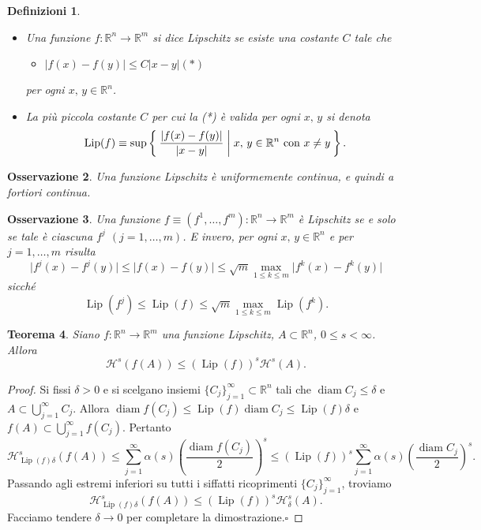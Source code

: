 \documentclass[a4paper,10pt,openright,oneside]{book}
\theoremstyle{theoremstyle}
\newtheorem{teorema}{Teorema}[section]
\theoremstyle{theoremstylewoheader}
\theoremstyle{theoremstyle}
\newtheorem{definizioni}[teorema]{Definizioni}
\newtheorem{osservazione}[teorema]{Osservazione}
\theoremstyle{proofsecstyle}
\theoremstyle{nonumberplain}
\newtheorem{proof}{Dim.}
\newcommand{\RR}{\ensuremath{\mathbb{R}}}
\newcommand{\Haus}{\ensuremath{\mathcal{H}}}
\newcommand{\abs}[1]{\ensuremath{\lvert #1 \rvert}}
\DeclareMathOperator{\diam}{diam}
\DeclareMathOperator{\Lip}{Lip}
\renewcommand{\qedsymbol}{\ensuremath{\square}}
\newcommand{\qed}{\unskip\nobreak\hfill\nobreak\hspace{.5em}\qedsymbol}
\newcommand{\mymath}[2]{\begin{itemize}%
  \item[]\hfill\hbox{}\ensuremath{\displaystyle #1}\hfill\ensuremath{\displaystyle #2}%
  \end{itemize}}
\begin{document}
\begin{definizioni}
\label{def:funzione_lipschitz}
\mbox{}
\begin{itemize}
\item[(i)] Una funzione $f : \RR^n \rightarrow \RR^m$ si dice \emph{Lipschitz} se esiste una costante $C$ tale che \mymath{\abs{f(x) - f(y)} \le C\abs{x - y}}{(*)} per ogni $x,\, y \in \RR^n$.
\item[(ii)] La più piccola costante $C$ per cui la (*) è valida per ogni $x,\, y$ si denota 
\[
\Lip(f) \equiv \sup\Set{ \frac{\abs{f(x) - f(y)}}{\abs{x - y}} | x,\,y \in \RR^n \text{ con $x \ne y$} }.
\]
\end{itemize}
\end{definizioni}

\begin{osservazione}
Una funzione Lipschitz è uniformemente continua, e quindi \emph{a fortiori} continua.
\end{osservazione}

\begin{osservazione}
\label{oss:componenti_funzione_lipschitz}
Una funzione $f \equiv (f^1, \ldots, f^m): \RR^n \rightarrow \RR^m$ è Lipschitz se e solo se tale è ciascuna $f^j$ $(j = 1, \ldots, m)$. E invero, per ogni $x,\, y \in \RR^n$ e per $j = 1, \ldots, m$ risulta
\[
\abs{f^j(x) - f^j(y)} \le \abs{f(x) - f(y)} \le \sqrt{m} \max_{1 \le k \le m} \abs{f^k(x) - f^k(y)}
\]
sicché
\[
\Lip(f^j) \le \Lip(f) \le \sqrt{m} \max_{1 \le k \le m} \Lip(f^k).
\]
\end{osservazione}

\begin{teorema}
\label{thm:misura_di_hausdorff_e_funzioni_lipschitz}
Siano $f : \RR^n \rightarrow \RR^m$ una funzione Lipschitz, $A \subset \RR^n$, $0 \le s < \infty$. Allora
\[
\Haus^s(f(A)) \le (\Lip(f))^s \Haus^s(A).
\]
\end{teorema}

\begin{proof}
Si fissi $\delta > 0$ e si scelgano insiemi $\{C_j\}_{j=1}^\infty \subset \RR^n$ tali che $\diam C_j \le \delta$ e $A \subset \bigcup_{j=1}^\infty C_j$. Allora $\diam f(C_j) \le \Lip(f) \diam C_j \le \Lip(f) \delta$ e $f(A) \subset \bigcup_{j=1}^\infty f(C_j)$. Pertanto
\[
\Haus_{\Lip(f)\delta}^s (f(A)) \le \sum_{j=1}^\infty \alpha(s) \left(\frac{\diam f(C_j)}{2}\right)^s \le (\Lip(f))^s \sum_{j=1}^\infty \alpha(s) \left(\frac{\diam C_j}{2}\right)^s.
\]
Passando agli estremi inferiori su tutti i siffatti ricoprimenti $\{C_j\}_{j=1}^\infty$, troviamo
\[
\Haus_{\Lip(f)\delta}^s (f(A)) \le (\Lip(f))^s \Haus_\delta^s(A).
\]
Facciamo tendere $\delta \to 0$ per completare la dimostrazione.\qed
\end{proof}
\end{document}
